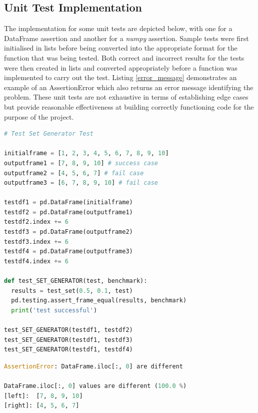 \documentclass[10pt,onecolumn,letterpaper]{article}
\begin{document}
\subsection{Unit Test Implementation} 

The implementation for some unit tests are depicted below, with one for a DataFrame assertion and another for a \textit{numpy} assertion. Sample tests were first initialised in lists before being converted into the appropriate format for the function that was being tested. Both correct and incorrect results for the tests were then created in lists and converted appropriately before a function was implemented to carry out the test. Listing \ref{error_message} demonstrates an example of an AssertionError which also returns an error message identifying the problem. These unit tests are not exhaustive in terms of establishing edge cases but provide reasonable effectiveness at building correctly functioning code for the purpose of the project.

\begin{lstlisting}[language=Python, breaklines=true, caption={Example of a DataFrame comparison test.}]
# Test Set Generator Test

initialframe = [1, 2, 3, 4, 5, 6, 7, 8, 9, 10]
outputframe1 = [7, 8, 9, 10] # success case
outputframe2 = [4, 5, 6, 7] # fail case
outputframe3 = [6, 7, 8, 9, 10] # fail case

testdf1 = pd.DataFrame(initialframe)
testdf2 = pd.DataFrame(outputframe1)
testdf2.index += 6
testdf3 = pd.DataFrame(outputframe2)
testdf3.index += 6
testdf4 = pd.DataFrame(outputframe3)
testdf4.index += 6

def test_SET_GENERATOR(test, benchmark):
  results = test_set(0.5, 0.1, test)
  pd.testing.assert_frame_equal(results, benchmark)
  print('test successful')

test_SET_GENERATOR(testdf1, testdf2)
test_SET_GENERATOR(testdf1, testdf3)
test_SET_GENERATOR(testdf1, testdf4)
\end{lstlisting} 

\begin{lstlisting}[language=Python, breaklines=true, caption={Assertion Error raised by the second fail case of the Test Set Generator Test.}, label={error_message}]
AssertionError: DataFrame.iloc[:, 0] are different

DataFrame.iloc[:, 0] values are different (100.0 %)
[left]:  [7, 8, 9, 10]
[right]: [4, 5, 6, 7]
\end{lstlisting} 
\end{document}
